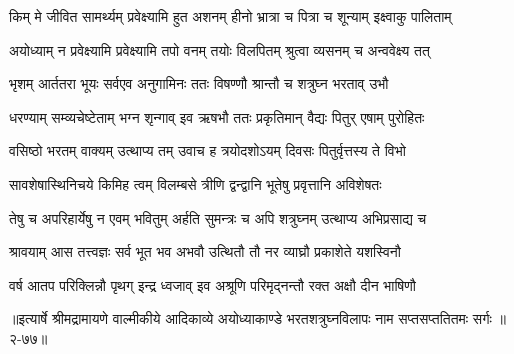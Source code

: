 \twolineshloka
{किम् मे जीवित सामर्थ्यम् प्रवेक्ष्यामि हुत अशनम्}
{हीनो भ्रात्रा च पित्रा च शून्याम् इक्ष्वाकु पालिताम्} %

\twolineshloka
{अयोध्याम् न प्रवेक्ष्यामि प्रवेक्ष्यामि तपो वनम्}
{तयोः विलपितम् श्रुत्वा व्यसनम् च अन्ववेक्ष्य तत्} %

\twolineshloka
{भृशम् आर्ततरा भूयः सर्वएव अनुगामिनः}
{ततः विषण्णौ श्रान्तौ च शत्रुघ्न भरताव् उभौ} %

\twolineshloka
{धरण्याम् सम्व्यचेष्टेताम् भग्न शृन्गाव् इव ऋषभौ}
{ततः प्रकृतिमान् वैद्यः पितुर् एषाम् पुरोहितः} %

\twolineshloka
{वसिष्ठो भरतम् वाक्यम् उत्थाप्य तम् उवाच ह}
{त्रयोदशोऽयम् दिवसः पितुर्वृत्तस्य ते विभो} %

\twolineshloka
{सावशेषास्थिनिचये किमिह त्वम् विलम्बसे}
{त्रीणि द्वन्द्वानि भूतेषु प्रवृत्तानि अविशेषतः} %

\twolineshloka
{तेषु च अपरिहार्येषु न एवम् भवितुम् अर्हति}
{सुमन्त्रः च अपि शत्रुघ्नम् उत्थाप्य अभिप्रसाद्य च} %

\twolineshloka
{श्रावयाम् आस तत्त्वज्ञः सर्व भूत भव अभवौ}
{उत्थितौ तौ नर व्याघ्रौ प्रकाशेते यशस्विनौ} %

\twolineshloka
{वर्ष आतप परिक्लिन्नौ पृथग् इन्द्र ध्वजाव् इव}
{अश्रूणि परिमृद्नन्तौ रक्त अक्षौ दीन भाषिणौ} %


॥इत्यार्षे श्रीमद्रामायणे वाल्मीकीये आदिकाव्ये अयोध्याकाण्डे भरतशत्रुघ्नविलापः नाम सप्तसप्ततितमः सर्गः ॥२-७७॥

